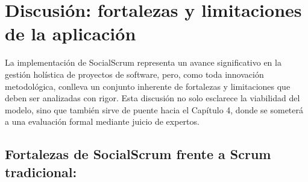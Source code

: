 \section{Discusión: fortalezas y limitaciones de la aplicación}
La implementación de SocialScrum representa un avance significativo en la gestión holística de proyectos de software, pero, como toda innovación metodológica, conlleva un conjunto inherente de fortalezas y limitaciones que deben ser analizadas con rigor. Esta discusión no solo esclarece la viabilidad del modelo, sino que también sirve de puente hacia el Capítulo 4, donde se someterá a una evaluación formal mediante juicio de expertos.

\subsection{Fortalezas de SocialScrum frente a Scrum tradicional:}
